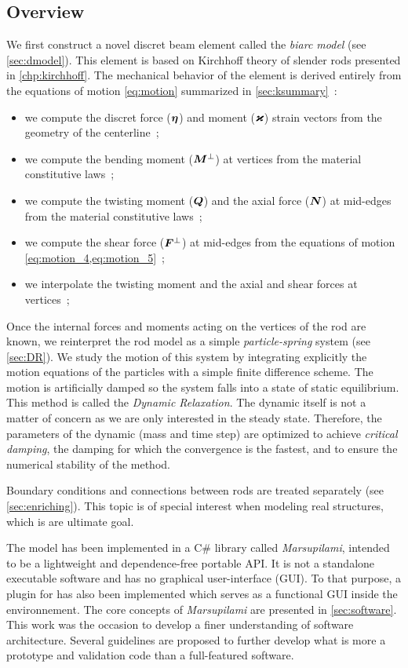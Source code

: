 \subsection{Overview}
We first construct a novel discret beam element called the \emph{biarc model} (see \cref{sec:dmodel}). This element is based on Kirchhoff theory of slender rods presented in \cref{chp:kirchhoff}. The mechanical behavior of the element is derived entirely from the equations of motion \cref{eq:motion} summarized in \cref{sec:ksummary}~:
\begin{itemize}
\item we compute the discret force ($\boldsymbol{\eta}$) and moment ($\boldsymbol{\varkappa}$) strain vectors from the geometry of the centerline~;
\item we compute the bending moment ($\boldsymbol{M}^{\perp}$) at vertices from the material constitutive laws~;
\item we compute the twisting moment ($\boldsymbol{Q}$) and the axial force ($\boldsymbol{N}$) at mid-edges from the material constitutive laws~;
\item we compute the shear force ($\boldsymbol{F}^{\perp}$) at mid-edges from the equations of motion \cref{eq:motion_4,eq:motion_5}~;
\item we interpolate the twisting moment and the axial and shear forces at vertices~;
\end{itemize}
Once the internal forces and moments acting on the vertices of the rod are known, we reinterpret the rod model as a simple \emph{particle-spring} system (see \cref{sec:DR}). We study the motion of this system by integrating explicitly the motion equations of the particles with a simple finite difference scheme. The motion is artificially damped so the system falls into a state of static equilibrium. This method is called the \emph{Dynamic Relaxation}. The dynamic itself is not a matter of concern as we are only interested in the steady state. Therefore, the parameters of the dynamic (mass and time step) are optimized to achieve \emph{critical damping}, the damping for which the convergence is the fastest, and to ensure the numerical stability of the method.

Boundary conditions and connections between rods are treated separately (see \cref{sec:enriching}). This topic is of special interest when modeling real structures, which is are ultimate goal.

The model has been implemented in a C\# library called \emph{Marsupilami}, intended to be a lightweight and dependence-free portable API. It is not a standalone executable software and has no graphical user-interface (GUI). To that purpose, a plugin for \grasshopper{} has also been implemented which serves as a functional GUI inside the \rhino{} environnement. The core concepts of \emph{Marsupilami} are presented in \cref{sec:software}. This work was the occasion to develop a finer understanding of software architecture. Several guidelines are proposed to further develop what is more a prototype and validation code than a full-featured software.

